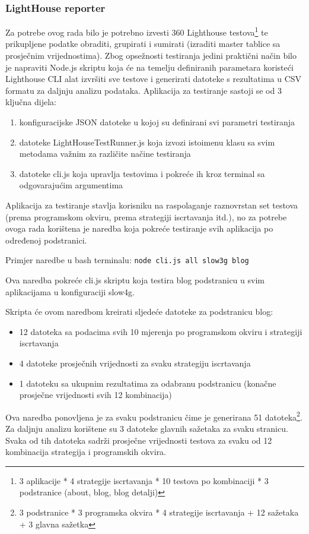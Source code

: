 \subsubsection{LightHouse reporter}

Za potrebe ovog rada bilo je potrebno izvesti 360 Lighthouse testova\footnote{3 aplikacije * 4 strategije iscrtavanja * 10 testova po kombinaciji * 3 podstranice (about, blog, blog detalji)} te prikupljene podatke obraditi, grupirati i sumirati (izraditi master tablice sa prosječnim vrijednostima). Zbog opsežnosti testiranja jedini praktični način bilo je napraviti Node.js skriptu koja će na temelju definiranih parametara koristeći Lighthouse CLI alat izvršiti sve testove i generirati datoteke s rezultatima u CSV formatu za daljnju analizu podataka.
Aplikacija za testiranje sastoji se od 3 ključna dijela:
\begin{enumerate}
    \item konfiguracijske JSON datoteke u kojoj su definirani svi parametri testiranja
    \item datoteke LightHouseTestRunner.js koja izvozi istoimenu klasu sa svim metodama važnim za različite načine testiranja
    \item datoteke cli.js koja upravlja testovima i pokreće ih kroz terminal sa odgovarajućim argumentima
\end{enumerate}

Aplikacija za testiranje stavlja korisniku na raspolaganje raznovrstan set testova (prema programskom okviru, prema strategiji iscrtavanja itd.), no za potrebe ovoga rada korištena je naredba koja pokreće testiranje svih aplikacija po određenoj podstranici.

\bigskip

Primjer naredbe u bash terminalu:
\texttt{node cli.js all slow3g blog}

Ova naredba pokreće cli.js skriptu koja testira blog podstranicu u svim aplikacijama u konfiguraciji slow4g.

\bigskip
Skripta će ovom naredbom kreirati sljedeće datoteke za podstranicu blog:
\begin{itemize}
    \item 12 datoteka sa podacima svih 10 mjerenja po programskom okviru i strategiji iscrtavanja
    \item 4 datoteke prosječnih vrijednosti za svaku strategiju iscrtavanja
    \item 1 datoteku sa ukupnim rezultatima za odabranu podstranicu (konačne prosječne vrijednosti svih 12 kombinacija)
\end{itemize}
Ova naredba ponovljena je za svaku podstranicu čime je generirana 51 datoteka\footnote{3 podstranice * 3 programska okvira * 4 strategije iscrtavanja + 12 sažetaka + 3 glavna sažetka}.
Za daljnju analizu korištene su 3 datoteke glavnih sažetaka za svaku stranicu. Svaka od tih datoteka sadrži prosječne vrijednosti testova za svaku od 12 kombinacija strategija i programskih okvira.

